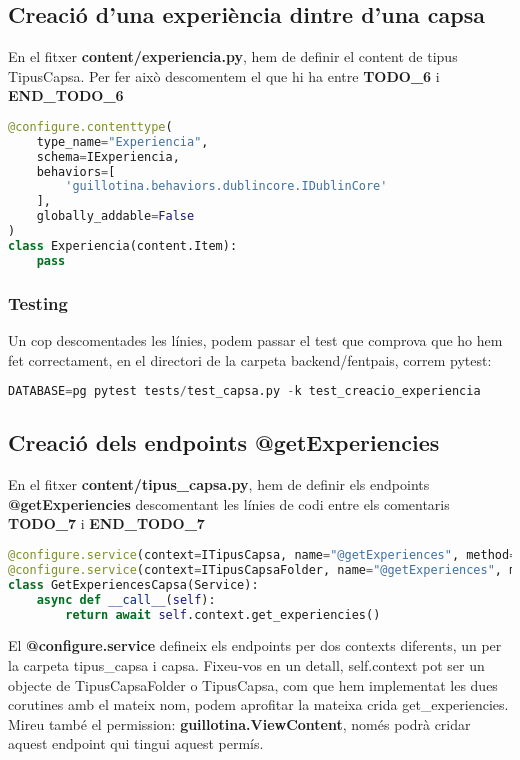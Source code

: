 \documentclass[a4paper, 11pt]{article}
\begin{document}
\subsection{Creació d'una experiència dintre d'una capsa}
En el fitxer \textbf{content/experiencia.py}, hem de definir el content de tipus
  TipusCapsa. Per fer això descomentem el que hi ha entre
  \textbf{TODO\_6} i \textbf{END\_TODO\_6}

\begin{lstlisting}[language=Python, caption=Definició content type Experiencia]
@configure.contenttype(
    type_name="Experiencia",
    schema=IExperiencia,
    behaviors=[
        'guillotina.behaviors.dublincore.IDublinCore'
    ],
    globally_addable=False
)
class Experiencia(content.Item):
    pass
\end{lstlisting}

\subsubsection{Testing}
Un cop descomentades les línies, podem passar el test que comprova
  que ho hem fet correctament, en el directori de la carpeta
  backend/fentpais, correm pytest:
  \begin{lstlisting}[language=Python, caption=Testing 3]
    DATABASE=pg pytest tests/test_capsa.py -k test_creacio_experiencia
  \end{lstlisting}

\subsection{Creació dels endpoints @getExperiencies}
En el fitxer \textbf{content/tipus\_capsa.py}, hem de definir els
endpoints \textbf{{@}getExperiencies} descomentant les línies de codi
entre els comentaris \textbf{TODO\_7} i \textbf{END\_TODO\_7}

\begin{lstlisting}[language=Python, caption=Definició endpoints]
@configure.service(context=ITipusCapsa, name="@getExperiences", method="GET", permission="guillotina.ViewContent")
@configure.service(context=ITipusCapsaFolder, name="@getExperiences", method="GET", permission="guillotina.ViewContent")
class GetExperiencesCapsa(Service):
    async def __call__(self):
        return await self.context.get_experiencies()
\end{lstlisting}
      
El \textbf{{@}configure.service} defineix els endpoints per dos contexts
diferents, un per la carpeta tipus\_capsa i capsa. Fixeu-vos en un
detall, self.context pot ser un objecte de TipusCapsaFolder o
TipusCapsa, com que hem implementat les dues corutines amb el mateix
nom, podem aprofitar la mateixa crida get\_experiencies. Mireu també
el permission: \textbf{guillotina.ViewContent}, només podrà cridar aquest
endpoint qui tingui aquest permís.
      
\end{document}
